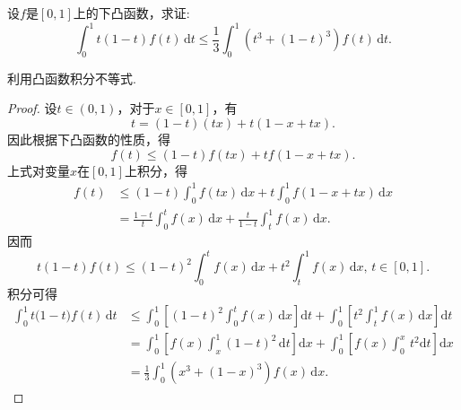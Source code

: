 \documentclass[../../main.tex]{subfiles}
\begin{document}
\begin{example}
设\( f \)是\([0,1]\)上的下凸函数，求证:
\[
\int_0^1 t(1-t)f(t)\,\text{d}t \leqslant \frac{1}{3}\int_0^1 \left(t^3 + (1-t)^3\right)f(t)\,\text{d}t.
\]
\end{example}
\begin{note}
利用凸函数积分不等式.
\end{note}
\begin{proof}
设\( t \in (0,1) \)，对于\( x \in [0,1] \)，有
\[
t = (1-t)(tx) + t(1 - x + tx).
\]
因此根据下凸函数的性质，得
\[
f(t) \leqslant (1-t)f(tx) + tf(1 - x + tx).
\]
上式对变量\( x \)在\([0,1]\)上积分，得
\begin{align*}
f(t) &\leqslant (1-t)\int_0^1 f(tx)\,\text{d}x + t\int_0^1 f(1 - x + tx)\,\text{d}x \\
&= \frac{1-t}{t} \int_0^t f(x)\,\text{d}x + \frac{t}{1-t}\int_t^1 f(x)\,\text{d}x.
\end{align*}
因而
\[
t(1-t)f(t) \leqslant (1-t)^2\int_0^t f(x)\,\text{d}x + t^2\int_t^1 f(x)\,\text{d}x, \, t \in [0,1].
\]
积分可得
\begin{align*}
\int_0^1{t(1}-t)f(t)\,\mathrm{d}t&\leqslant \int_0^1{\left[ (1-t)^2\int_0^t{f(x)\,\mathrm{d}x} \right] \mathrm{d}t}+\int_0^1{\left[ t^2\int_t^1{f(x)\,\mathrm{d}x} \right] \mathrm{d}t}
\\
&=\int_0^1{\left[ f\left( x \right) \int_x^1{(1-t)^2\,\mathrm{d}t} \right] \mathrm{d}x}+\int_0^1{\left[ f(x)\int_0^x{\,t^2\mathrm{d}t} \right] \mathrm{d}x}
\\
&=\frac{1}{3}\int_0^1{\left( x^3+(1-x)^3 \right) f(x)\,\mathrm{d}x}.
\end{align*}

\end{proof}
\end{document}
